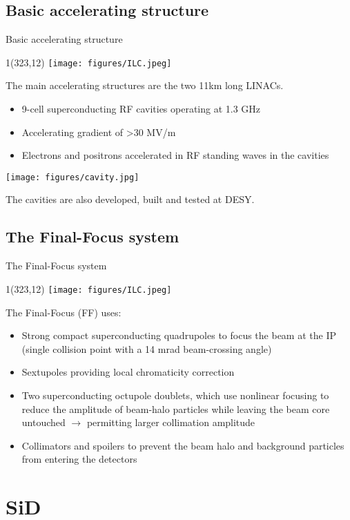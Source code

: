 \documentclass[xcolor={dvipsnames}]{beamer}
\newcommand{\ilclogo}{
  \setlength{\TPHorizModule}{1pt}
  \setlength{\TPVertModule}{1pt}
  \begin{textblock}{1}(323,12)
   \texttt{[image: figures/ILC.jpeg]}
  \end{textblock}
}
\begin{document}
\subsection{Basic accelerating structure}
\begin{frame}{Basic accelerating structure}
\ilclogo
The main accelerating structures are the two 11km long LINACs.
\begin{itemize}
\item 9-cell superconducting RF cavities operating at 1.3 GHz 
\item Accelerating gradient of >30 MV/m
\item Electrons and positrons accelerated in RF standing waves in the cavities 
\end{itemize}
\begin{center}
\texttt{[image: figures/cavity.jpg]}
\end{center}
The cavities are also developed, built and tested at DESY.
\end{frame}

\subsection{The Final-Focus system}
\begin{frame}{The Final-Focus system}
 \ilclogo
 The Final-Focus (FF) uses:
\begin{itemize}
 \item Strong compact superconducting quadrupoles to focus the
beam at the IP (single collision point with a 14 mrad beam-crossing angle)
\item Sextupoles providing local chromaticity correction
\item Two superconducting octupole doublets, which use nonlinear
focusing to reduce the amplitude of beam-halo particles while leaving the beam core untouched $\rightarrow$ permitting larger collimation amplitude
\item Collimators and spoilers to prevent the beam halo and background particles from entering the detectors
\end{itemize}
\end{frame}

\section{SiD}
\end{document}
